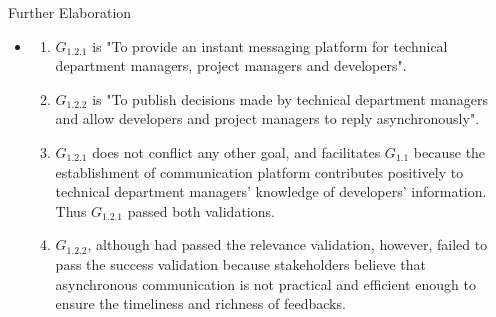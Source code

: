 \documentclass{beamer}
\begin{document}
\begin{frame} {Further Elaboration}
  \begin{itemize}
  \item
    \begin{enumerate}
    \item $G_{1.2.1}$ is "To provide an instant messaging platform for technical department managers, project managers and developers".
    \item  $G_{1.2.2}$ is "To publish decisions made by technical department managers and allow developers and project managers to reply asynchronously".
    \item $G_{1.2.1}$ does not conflict any other goal, and facilitates $G_{1.1}$ because the establishment of communication platform contributes positively to technical department managers' knowledge of developers' information. Thus $G_{1.2.1}$ passed both validations.
    \item $G_{1.2.2}$, although had passed the relevance validation, however, failed to pass the success validation because stakeholders believe that asynchronous communication is not practical and efficient enough to ensure the timeliness and richness of feedbacks.      
    \end{enumerate}
  \end{itemize}
\end{frame}

 
\end{document}
